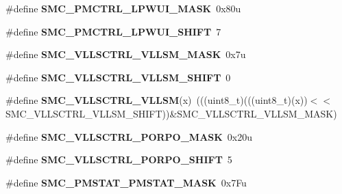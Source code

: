 \begin{DoxyCompactItemize}
\item 
\#define {\bfseries S\+M\+C\+\_\+\+P\+M\+C\+T\+R\+L\+\_\+\+L\+P\+W\+U\+I\+\_\+\+M\+A\+SK}~0x80u\hypertarget{group__SMC__Register__Masks_ga13fe417a536c3dc080bb978a13a6364d}{}\label{group__SMC__Register__Masks_ga13fe417a536c3dc080bb978a13a6364d}

\item 
\#define {\bfseries S\+M\+C\+\_\+\+P\+M\+C\+T\+R\+L\+\_\+\+L\+P\+W\+U\+I\+\_\+\+S\+H\+I\+FT}~7\hypertarget{group__SMC__Register__Masks_ga923f713c8f946601de6acd8088624b20}{}\label{group__SMC__Register__Masks_ga923f713c8f946601de6acd8088624b20}

\item 
\#define {\bfseries S\+M\+C\+\_\+\+V\+L\+L\+S\+C\+T\+R\+L\+\_\+\+V\+L\+L\+S\+M\+\_\+\+M\+A\+SK}~0x7u\hypertarget{group__SMC__Register__Masks_ga4f4e91c4841316ab1eae1a74c0091ff4}{}\label{group__SMC__Register__Masks_ga4f4e91c4841316ab1eae1a74c0091ff4}

\item 
\#define {\bfseries S\+M\+C\+\_\+\+V\+L\+L\+S\+C\+T\+R\+L\+\_\+\+V\+L\+L\+S\+M\+\_\+\+S\+H\+I\+FT}~0\hypertarget{group__SMC__Register__Masks_ga67af6c7ed0835ed408cf511e8b9c9b13}{}\label{group__SMC__Register__Masks_ga67af6c7ed0835ed408cf511e8b9c9b13}

\item 
\#define {\bfseries S\+M\+C\+\_\+\+V\+L\+L\+S\+C\+T\+R\+L\+\_\+\+V\+L\+L\+SM}(x)~(((uint8\+\_\+t)(((uint8\+\_\+t)(x))$<$$<$S\+M\+C\+\_\+\+V\+L\+L\+S\+C\+T\+R\+L\+\_\+\+V\+L\+L\+S\+M\+\_\+\+S\+H\+I\+FT))\&S\+M\+C\+\_\+\+V\+L\+L\+S\+C\+T\+R\+L\+\_\+\+V\+L\+L\+S\+M\+\_\+\+M\+A\+SK)\hypertarget{group__SMC__Register__Masks_ga1358fb0c1720e22d38d6fccaf0cdfd34}{}\label{group__SMC__Register__Masks_ga1358fb0c1720e22d38d6fccaf0cdfd34}

\item 
\#define {\bfseries S\+M\+C\+\_\+\+V\+L\+L\+S\+C\+T\+R\+L\+\_\+\+P\+O\+R\+P\+O\+\_\+\+M\+A\+SK}~0x20u\hypertarget{group__SMC__Register__Masks_ga44691ea357e857b84a0f2f6db808ae0d}{}\label{group__SMC__Register__Masks_ga44691ea357e857b84a0f2f6db808ae0d}

\item 
\#define {\bfseries S\+M\+C\+\_\+\+V\+L\+L\+S\+C\+T\+R\+L\+\_\+\+P\+O\+R\+P\+O\+\_\+\+S\+H\+I\+FT}~5\hypertarget{group__SMC__Register__Masks_ga255471752ad43100216590dba76a5a0e}{}\label{group__SMC__Register__Masks_ga255471752ad43100216590dba76a5a0e}

\item 
\#define {\bfseries S\+M\+C\+\_\+\+P\+M\+S\+T\+A\+T\+\_\+\+P\+M\+S\+T\+A\+T\+\_\+\+M\+A\+SK}~0x7\+Fu\hypertarget{group__SMC__Register__Masks_ga2574f973caed7a43c1d0b69888866f63}{}\label{group__SMC__Register__Masks_ga2574f973caed7a43c1d0b69888866f63}


\end{DoxyCompactItemize}
